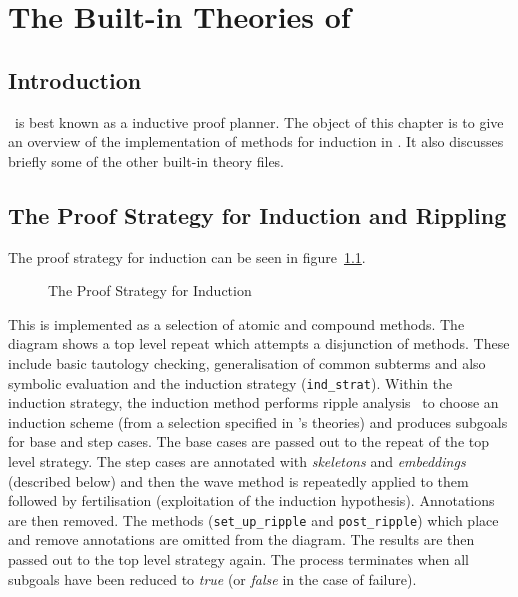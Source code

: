 \chapter{The Built-in Theories of \lclam\ }
\label{theories}


\section{Introduction}
\lclam\ is best known as a inductive proof planner.  The object of
this chapter is to give an overview of the implementation of methods
for induction in \lclam.  It also discusses briefly some of the other
built-in theory files.

\section{The Proof Strategy for Induction and Rippling}
The proof strategy for induction can be seen in 
figure~\ref{fig:induction_strategy}.  
\begin{figure}[htb]
\begin{center}
\end{center}
\caption{The Proof Strategy for Induction}
\label{fig:induction_strategy}
\end{figure}
This is implemented as a selection of atomic and compound methods.
The diagram shows a top level repeat which attempts a disjunction of
methods.  These include basic tautology checking, generalisation of
common subterms and also symbolic
evaluation and the induction strategy ({\tt ind\_strat}).  Within the
induction strategy, the induction method
performs ripple
analysis~\cite{ind-chap-ref2} to choose an induction scheme (from a
selection specified in \lclam's theories) and produces subgoals for
base and step cases.  The base cases
are passed out to the repeat of the top level strategy.
The step cases are annotated with \emph{skeletons} and
\emph{embeddings} (described 
below) and then the wave method is repeatedly applied to them followed 
by fertilisation (exploitation of the induction hypothesis).
Annotations are then removed.  The methods ({\tt set\_up\_ripple} and
{\tt post\_ripple}) which place and remove annotations are omitted
from the diagram.  The results are then passed out to the top level
strategy again.  The process terminates when all subgoals have been
reduced to \emph{true} (or \emph{false} in the case of failure).

